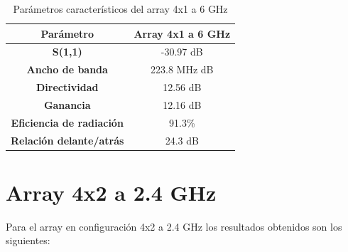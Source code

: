 \begin{table}[H]
  
   
   \small %
   \centering %
   \begin{tabular}{c c} %
   \toprule[\heavyrulewidth]\toprule[\heavyrulewidth]
   \textbf{Parámetro} & \textbf{Array 4x1 a 6 GHz} \\ 
   \midrule
   \textbf{S(1,1)} & -30.97 dB \\
   \textbf{Ancho de banda} & 223.8 MHz dB \\
   \textbf{Directividad} & 12.56 dB \\
   \textbf{Ganancia} & 12.16 dB \\
   \textbf{Eficiencia de radiación} & 91.3\% \\
   \textbf{Relación delante/atrás} & 24.3 dB \\

   \bottomrule[\heavyrulewidth] 
   \end{tabular}
   
   \caption{Parámetros característicos del array 4x1 a 6 GHz} 
   \label{tab:res4x12}
\end{table}























\newpage
\section{Array 4x2 a 2.4 GHz}
\par Para el array en configuración 4x2 a 2.4 GHz los resultados obtenidos son los siguientes:

